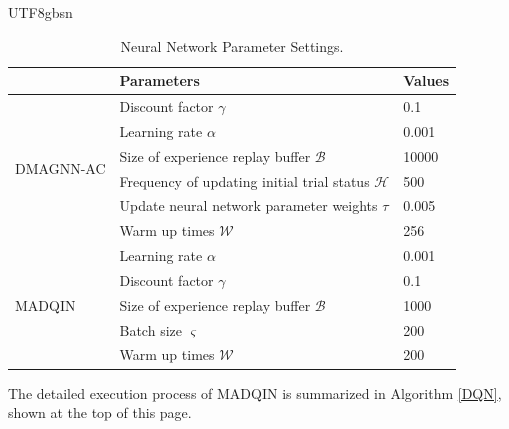 \documentclass[lettersize,journal]{IEEEtran}
\begin{document}
\begin{CJK}{UTF8}{gbsn}
\begin{table}[t]
  \begin{center}\label{table2}
    \caption{Neural Network Parameter Settings.}
    \begin{tabular}{@{}lll@{}}
			\toprule
			                          & \textbf{Parameters}                        & \textbf{Values} \\ \midrule
			\multirow{6}{*}{DMAGNN-AC} & Discount factor $\gamma$                   & 0.1             \\
			                          & Learning rate $\alpha $                    & 0.001           \\
			                          & Size of experience replay buffer $\mathcal{B}$           & 10000   \\
			                          & Frequency of updating initial trial status $\mathcal{H}$ & 500     \\
			                          & Update neural network parameter weights $\tau$   & 0.005           \\
			                          & Warm up times   $\mathcal{W}$              & 256             \\ \midrule
			\multirow{5}{*}{MADQIN}   & Learning rate   $\alpha $                  & 0.001           \\
			                          & Discount factor $\gamma$                   & 0.1             \\
			                          & Size of experience replay buffer  $\mathcal{B}$         & 1000     \\
			                          & Batch size      $\varsigma$                & 200             \\
			                          & Warm up times  $\mathcal{W}$               & 200             \\ \midrule
			\end{tabular}
  \end{center}
\end{table}

The detailed execution process of MADQIN is summarized in Algorithm \ref{DQN}, shown at the top of this page.


\end{CJK}
\end{document}
